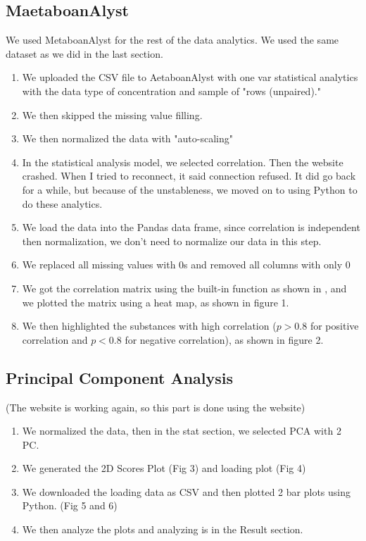 \documentclass{article}
\begin{document}
\subsection*{MaetaboanAlyst}
We used MetaboanAlyst for the rest of the data analytics.  We used the same dataset as we did in the last section. 


\begin{enumerate}
    \item We uploaded the CSV file to AetaboanAlyst with one var statistical analytics with the data type of concentration and sample of "rows (unpaired)." 
    \item We then skipped the missing value filling.
    \item We then normalized the data with "auto-scaling"
    \item In the statistical analysis model, we selected correlation. Then the website crashed. When I tried to reconnect, it said connection refused. It did go back for a while, but because of the unstableness, we moved on to using Python to do these analytics. 
    \item We load the data into the Pandas data frame, since correlation is independent then normalization, we don't need to normalize our data in this step.
    \item We replaced all missing values with 0s and removed all columns with only 0
    \item We got the correlation matrix using the built-in function as shown in \cite{pandaCo}, and we plotted the matrix using a heat map, as shown in figure 1.
    \item We then highlighted the substances with high correlation ($p>0.8$ for positive correlation and $p<0.8$ for negative correlation), as shown in figure 2.
    
\end{enumerate}

\subsection*{Principal Component Analysis}
(The website is working again, so this part is done using the website)
\begin{enumerate}
    \item We normalized the data, then in the stat section, we selected PCA with 2 PC.
    \item We generated the 2D Scores Plot (Fig 3) and loading plot (Fig 4)
    \item We downloaded the loading data as CSV and then plotted 2 bar plots using Python. (Fig 5 and 6)
    \item We then analyze the plots and analyzing is in the Result section. 
\end{enumerate}
\end{document}
